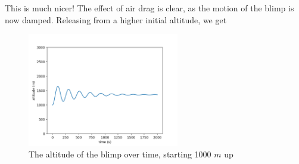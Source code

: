 \documentclass[titlepage]{article}
\begin{document}
This is much nicer! The effect of air drag is clear, as the motion of the blimp is now damped. Releasing from a higher initial altitude, we get
\begin{figure}[h]
    \centering
    \includegraphics[width=250px]{p2_drag_1000.png}
    \caption{The altitude of the blimp over time, starting 1000 $m$ up}
\end{figure}


\newpage



\thispagestyle{empty}
\end{document}
